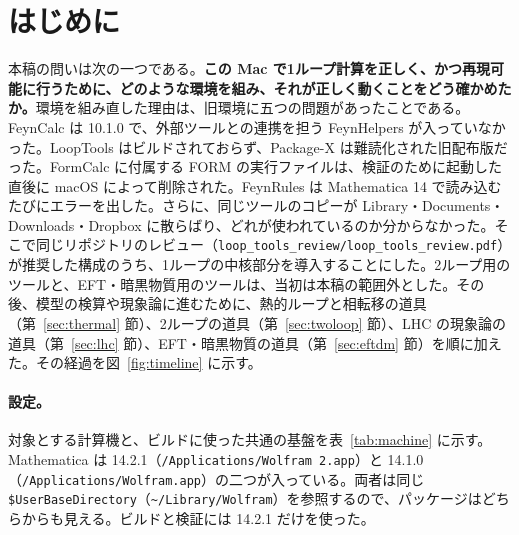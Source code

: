 \documentclass[a4paper,10pt]{ltjsarticle}
\newcommand{\pth}[1]{\texttt{\textasciitilde/}\nolinkurl{#1}}
\begin{document}
\begin{abstract}
と衝突し、駆動プログラムに \texttt{external Split} を加える必要があった（表~\ref{tab:issues2y}）。
\end{abstract}

\section{はじめに}\label{sec:intro}

本稿の問いは次の一つである。\textbf{この Mac で1ループ計算を正しく、かつ再現可能に行うために、どのような環境を組み、それが正しく動くことをどう確かめたか。}環境を組み直した理由は、旧環境に五つの問題があったことである。FeynCalc は 10.1.0 で、外部ツールとの連携を担う FeynHelpers が入っていなかった。LoopTools はビルドされておらず、Package-X は難読化された旧配布版だった。FormCalc に付属する FORM の実行ファイルは、検証のために起動した直後に macOS によって削除された。FeynRules は Mathematica 14 で読み込むたびにエラーを出した。さらに、同じツールのコピーが Library・Documents・Downloads・Dropbox に散らばり、どれが使われているのか分からなかった。そこで同じリポジトリのレビュー（\nolinkurl{loop_tools_review/loop_tools_review.pdf}）が推奨した構成のうち、1ループの中核部分を導入することにした。2ループ用のツールと、EFT・暗黒物質用のツールは、当初は本稿の範囲外とした。その後、模型の検算や現象論に進むために、熱的ループと相転移の道具（第~\ref{sec:thermal} 節）、2ループの道具（第~\ref{sec:twoloop} 節）、LHC の現象論の道具（第~\ref{sec:lhc} 節）、EFT・暗黒物質の道具（第~\ref{sec:eftdm} 節）を順に加えた。その経過を図~\ref{fig:timeline} に示す。

\paragraph{設定。}対象とする計算機と、ビルドに使った共通の基盤を表~\ref{tab:machine} に示す。Mathematica は 14.2.1（\texttt{/Applications/Wolfram 2.app}）と 14.1.0（\texttt{/Applications/Wolfram.app}）の二つが入っている。両者は同じ \texttt{\$UserBaseDirectory}（\pth{Library/Wolfram}）を参照するので、パッケージはどちらからも見える。ビルドと検証には 14.2.1 だけを使った。
\end{document}
